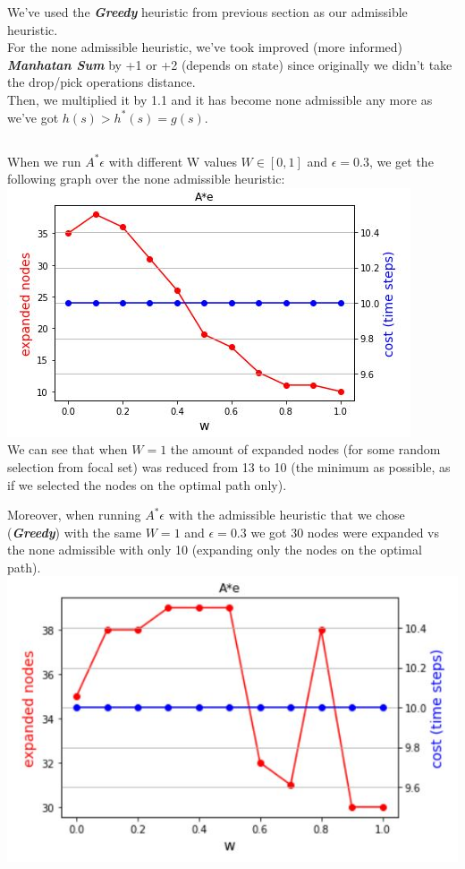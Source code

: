 \documentclass[12pt]{article}
\begin{document}
We've used the {\textit{\textbf{Greedy}}} heuristic from previous section as our admissible heuristic.\\
For the none admissible heuristic, we've took improved (more informed) {\textit{\textbf{Manhatan Sum}}} by +1 or +2 (depends on state) since originally we didn't take the drop/pick operations distance.\\
Then, we multiplied it by 1.1 and it has become none admissible any more as we've got  $h(s) > h^*(s) = g(s)$.

\subsection{}

When we run $A^*\epsilon$ with different W values $W\in[0,1]$ and $\epsilon = 0.3$, we get the following graph over the none admissible heuristic:\\
\includegraphics[scale=1]{hw1/w_graph_more_accurate.JPG}\\

We can see that when $W=1$ the amount of expanded nodes (for some random selection from focal set) was reduced from 13 to 10 (the minimum as possible, as if we selected the nodes on the optimal path only).

Moreover, when running $A^*\epsilon$ with the admissible heuristic that we chose ({\textit{\textbf{Greedy}}}) with the same $W=1$ and $\epsilon = 0.3$ we got 30 nodes were expanded vs the none admissible with only 10 (expanding only the nodes on the optimal path).\\
\includegraphics[scale=1]{hw1/w_graph_eps_addmis.JPG}\\
\end{document}
